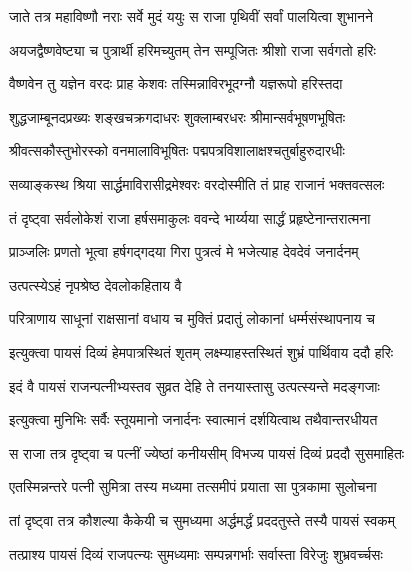 \twolineshloka
{जाते तत्र महाविष्णौ नराः सर्वे मुदं ययुः}
{स राजा पृथिवीं सर्वां पालयित्वा शुभानने}%

\twolineshloka
{अयजद्वैष्णवेष्ट्या च पुत्रार्थी हरिमच्युतम्}
{तेन सम्पूजितः श्रीशो राजा सर्वगतो हरिः}%

\twolineshloka
{वैष्णवेन तु यज्ञेन वरदः प्राह केशवः}
{तस्मिन्नाविरभूदग्नौ यज्ञरूपो हरिस्तदा}%

\twolineshloka
{शुद्धजाम्बूनदप्रख्यः शङ्खचक्रगदाधरः}
{शुक्लाम्बरधरः श्रीमान्सर्वभूषणभूषितः}%

\twolineshloka
{श्रीवत्सकौस्तुभोरस्को वनमालाविभूषितः}
{पद्मपत्रविशालाक्षश्चतुर्बाहुरुदारधीः}%

\twolineshloka
{सव्याङ्कस्थ श्रिया सार्द्धमाविरासीद्रमेश्वरः}
{वरदोस्मीति तं प्राह राजानं भक्तवत्सलः}%

\twolineshloka
{तं दृष्ट्वा सर्वलोकेशं राजा हर्षसमाकुलः}
{ववन्दे भार्य्यया सार्द्धं प्रहृष्टेनान्तरात्मना}%

\twolineshloka
{प्राञ्जलिः प्रणतो भूत्वा हर्षगद्गदया गिरा}
{पुत्रत्वं मे भजेत्याह देवदेवं जनार्दनम्}%


\onelineshloka
{उत्पत्स्येऽहं नृपश्रेष्ठ देवलोकहिताय वै}%

\twolineshloka
{परित्राणाय साधूनां राक्षसानां वधाय च}
{मुक्तिं प्रदातुं लोकानां धर्म्मसंस्थापनाय च}%


\twolineshloka
{इत्युक्त्वा पायसं दिव्यं हेमपात्रस्थितं शृतम्}
{लक्ष्म्याहस्तस्थितं शुभ्रं पार्थिवाय ददौ हरिः}%


\twolineshloka
{इदं वै पायसं राजन्पत्नीभ्यस्तव सुव्रत}
{देहि ते तनयास्तासु उत्पत्स्यन्ते मदङ्गजाः}%


\twolineshloka
{इत्युक्त्वा मुनिभिः सर्वैः स्तूयमानो जनार्दनः}
{स्वात्मानं दर्शयित्वाथ तथैवान्तरधीयत}%

\twolineshloka
{स राजा तत्र दृष्ट्वा च पत्नीं ज्येष्ठां कनीयसीम्}
{विभज्य पायसं दिव्यं प्रददौ सुसमाहितः}%

\twolineshloka
{एतस्मिन्नन्तरे पत्नी सुमित्रा तस्य मध्यमा}
{तत्समीपं प्रयाता सा पुत्रकामा सुलोचना}%

\twolineshloka
{तां दृष्ट्वा तत्र कौशल्या कैकेयी च सुमध्यमा}
{अर्द्धमर्द्धं प्रददतुस्ते तस्यै पायसं स्वकम्}%

\twolineshloka
{तत्प्राश्य पायसं दिव्यं राजपत्न्यः सुमध्यमाः}
{सम्पन्नगर्भाः सर्वास्ता विरेजुः शुभ्रवर्च्चसः}%

